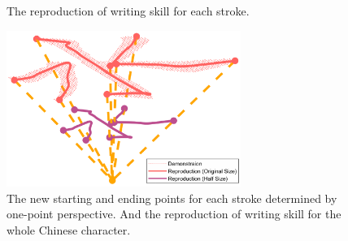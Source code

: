 \documentclass[journal]{IEEEtran}
\begin{document}
\begin{figure}[!t]
    \centering
    \quad
    \caption{The reproduction of writing skill for each stroke.}
    \label{fig6}
\end{figure}

\begin{figure}[!t]
    \centering
    \includegraphics[width=3in]{./fig/fig7.pdf}
    \caption{The new starting and ending points for each stroke determined by one-point perspective. And the reproduction of writing skill for the whole Chinese character.}
    \label{fig7}
\end{figure}
\end{document}
